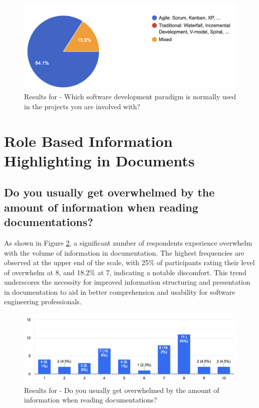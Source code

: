 \begin{figure}[h!]
\centering
\includegraphics[width=\linewidth]{Images/Survey/demo_5.png}
\caption{Results for - Which software development paradigm is normally used in the projects you are involved with?}
\label{fig:results:demo:5}
\end{figure}

\pagebreak


\section{Role Based Information Highlighting in Documents}

\subsection*{Do you usually get overwhelmed by the amount of information when reading documentations?}
As shown in Figure \ref{fig:results:highlighting:1}, a significant number of respondents experience overwhelm with the volume of information in documentation. The highest frequencies are observed at the upper end of the scale, with 25\% of participants rating their level of overwhelm at 8, and 18.2\% at 7, indicating a notable discomfort. This trend underscores the necessity for improved information structuring and presentation in documentation to aid in better comprehension and usability for software engineering professionals. 


\begin{figure}[h!]
\centering
\includegraphics[width=\linewidth]{Images/Survey/documents_1.png}
\caption{Results for - Do you usually get overwhelmed by the amount of information when reading documentations?}
\label{fig:results:highlighting:1}
\end{figure}

